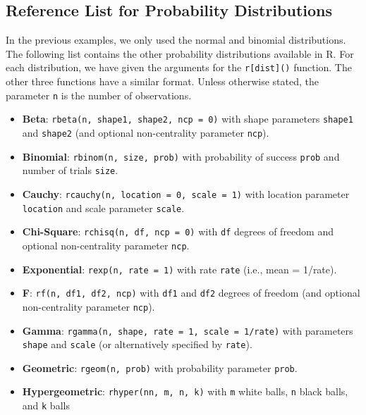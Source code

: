 \documentclass[
  letterpaper,
]{latex/krantz}
\providecommand{\tightlist}{%
  \setlength{\itemsep}{0pt}\setlength{\parskip}{0pt}}\usepackage{longtable,booktabs,array}
\begin{document}
\subsection{\texorpdfstring{Reference List for Probability Distributions
}{Reference List for Probability Distributions }}\label{reference-list-for-probability-distributions}

In the previous examples, we only used the normal and binomial
distributions. The following list contains the other probability
distributions available in R. For each distribution, we have given the
arguments for the \texttt{r{[}dist{]}()} function. The other three
functions have a similar format. Unless otherwise stated, the parameter
\texttt{n} is the number of observations.

\begin{itemize}
\tightlist
\item
  \textbf{Beta}: \texttt{rbeta(n,\ shape1,\ shape2,\ ncp\ =\ 0)} with
  shape parameters \texttt{shape1} and \texttt{shape2} (and optional
  non-centrality parameter \texttt{ncp}).
\item
  \textbf{Binomial}: \texttt{rbinom(n,\ size,\ prob)} with probability
  of success \texttt{prob} and number of trials \texttt{size}.
\item
  \textbf{Cauchy}: \texttt{rcauchy(n,\ location\ =\ 0,\ scale\ =\ 1)}
  with location parameter \texttt{location} and scale parameter
  \texttt{scale}.
\item
  \textbf{Chi-Square}: \texttt{rchisq(n,\ df,\ ncp\ =\ 0)} with
  \texttt{df} degrees of freedom and optional non-centrality parameter
  \texttt{ncp}.
\item
  \textbf{Exponential}: \texttt{rexp(n,\ rate\ =\ 1)} with rate
  \texttt{rate} (i.e., mean = 1/rate).
\item
  \textbf{F}: \texttt{rf(n,\ df1,\ df2,\ ncp)} with \texttt{df1} and
  \texttt{df2} degrees of freedom (and optional non-centrality parameter
  \texttt{ncp}).
\item
  \textbf{Gamma}:
  \texttt{rgamma(n,\ shape,\ rate\ =\ 1,\ scale\ =\ 1/rate)} with
  parameters \texttt{shape} and \texttt{scale} (or alternatively
  specified by \texttt{rate}).
\item
  \textbf{Geometric}: \texttt{rgeom(n,\ prob)} with probability
  parameter \texttt{prob}.
\item
  \textbf{Hypergeometric}: \texttt{rhyper(nn,\ m,\ n,\ k)} with
  \texttt{m} white balls, \texttt{n} black balls, and \texttt{k} balls

\end{itemize}
\end{document}
